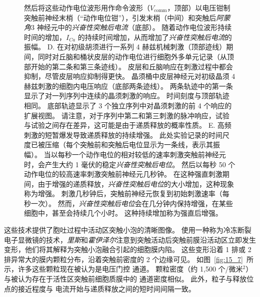 \begin{figure}[htbp]
{		然后将这些动作电位波形用作命令波形（$V_\text{comm}$，顶部）以电压钳制突触前神经末梢（“动作电位钳”），引发末梢（中间）和突触后\textit{阿蒙角}3 神经元中的\textit{兴奋性突触后电流}（底部）。
		随着动作电位波形持续时间的增加，$I_{Ca}$ 的持续时间增加，从而增加了\textit{兴奋性突触后电流}的振幅\cite{geiger2000dynamic}。
		D. 在对初级胡须进行一系列 4 赫兹机械刺激（顶部迹线）期间，同时对丘脑和桶状皮层的动作电位进行细胞外多单元记录（从顶部开始的第二条和第三条迹线）。
		皮层和丘脑响应在刺激过程中都会抑制，尽管皮层响应抑制得更快。
		晶须桶中皮层神经元对初级晶须 4 赫兹刺激的细胞内电压响应（底部两条迹线）。
		两条轨迹中的第一条显示了对一列序列中连续的晶须刺激的响应。
		时间刻度与顶部轨迹相同。
		底部轨迹显示了 3 个独立序列中对晶须刺激的前 4 个响应的扩展视图。
		请注意，对于序列中第二和第三刺激的脉冲响应，试验与试验之间存在差异，这可能是由于递质释放的概率性质\cite{chung2002short}。
		E. 高频刺激的短暂爆发导致递质释放的持续增强。
		此处实验记录的时间尺度已被压缩（每个突触前和突触后电位显示为一条线，表示其振幅）。
		当以每秒一个动作电位的相对较低的速率刺激突触前神经元时，会产生大约 1 毫伏的稳定\textit{兴奋性突触后电位}。
		然后以每秒 50 个动作电位的较高速率刺激突触前神经元几秒钟。
		在这种强直刺激期间，由于增强的递质释放，\textit{兴奋性突触后电位}的大小增加，这种现象称为增强。
		刺激几秒钟后，突触前神经元恢复到初始刺激速率（每秒一次）。
		然而，\textit{兴奋性突触后电位}会在几分钟内保持增强，在某些细胞中，甚至会持续几个小时。
		这种持续增加称为强直后增强。}
	\label{fig:15_15}
\end{figure}


这些技术提供了胞吐过程中活动区突触小泡的清晰图像。 
使用一种称为冷冻断裂电子显微镜的技术，\textit{里斯}和\textit{霍伊泽尔}注意到突触活动后突触前膜沿活动区立即发生变形，他们将其解释为突触小泡融合引起的细胞膜内陷。 
这些变形沿着 1 排或 2 排异常大的膜内颗粒分布，沿着突触前密度的 2 个边缘可见。
如图~\ref{fig:15_7}~所示，许多这些颗粒现在被认为是电压门控  通道。
颗粒密度（约 1,500 个/微米$ ^2 $）与被认为存在于活性区突触前细胞质膜中的  通道密度相似。
此外，粒子与释放位点的接近程度与  电流开始与递质释放之间的短时间间隔一致。


